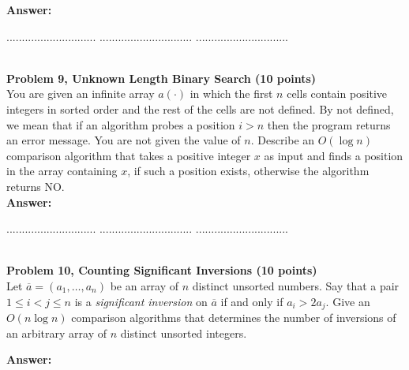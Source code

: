 \documentclass{article}
\begin{document}
\noindent
{\bf Answer:}


\pagebreak
{} $.............................$
 $..............................$
          $..............................$

\noindent
{}\\

\noindent
{\bf Problem 9,  Unknown Length Binary Search (10 points)}\\
You are given an infinite array $a(\cdot )$ in which the first $n$ cells 
contain positive integers in sorted order 
and the rest of the cells are not defined. 
By not defined, we mean that if an algorithm probes a position $i > n$ then the program returns an error message.
You are not given the value of $n$. Describe an $O(\log n )$ comparison algorithm that
takes a positive integer $x$ as input 
and finds a position in the array containing $x$, if such a position exists, 
otherwise the algorithm returns NO. \\


\noindent
{\bf Answer:}

\pagebreak
{} $.............................$
 $..............................$
          $..............................$

\noindent
{}\\

\noindent
{\bf Problem 10, Counting Significant Inversions (10 points)}\\
\noindent
Let $\overline{a}=(a_1 , \ldots , a_n )$ be an array of $n$ distinct unsorted numbers.
Say that a pair $1 \leq i < j \leq n$ is a {\em significant inversion} on $\overline{a}$ if and only if 
$a_i > 2 a_j$.  
Give an $O(n \log n)$ comparison algorithms that determines the number of inversions 
of an arbitrary array of $n$ distinct unsorted integers.

\noindent
{\bf Answer:}
\end{document}
